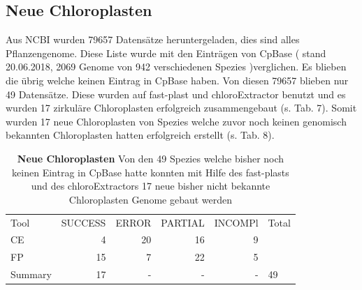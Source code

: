 \documentclass{scrartcl}
\begin{document}
\subsection{Neue Chloroplasten}
\label{sec-4-10}
Aus NCBI wurden 79657 Datensätze heruntergeladen, dies sind alles Pflanzengenome. Diese Liste wurde mit den Einträgen von CpBase ( stand 20.06.2018, 2069 Genome von 942 verschiedenen Spezies )verglichen. Es blieben die übrig welche keinen Eintrag in CpBase haben. 
Von diesen 79657 blieben nur 49 Datensätze. Diese wurden auf fast-plast und chloroExtractor benutzt und es wurden 17 zirkuläre Chloroplasten erfolgreich zusammengebaut (s. Tab. 7). Somit wurden 17 neue Chloroplasten von Spezies
welche zuvor noch keinen genomisch bekannten Chloroplasten hatten erfolgreich erstellt (s. Tab. 8).
\begin{table}[!h]
\caption[Neue Chloroplasten]{\textbf{Neue Chloroplasten} Von den 49 Spezies welche bisher noch keinen Eintrag in CpBase hatte konnten mit Hilfe des fast-plasts und des chloroExtractors 17 neue bisher nicht bekannte Chloroplasten Genome gebaut werden}
\begin{center}
\begin{tabular}{lrrrrl}
Tool & SUCCESS & ERROR & PARTIAL & INCOMPl & Total\\
CE & 4 & 20 & 16 & 9 & \\
FP & 15 & 7 & 22 & 5 & \\
Summary & 17 & - & - & - & 49\\
\end{tabular}
\end{center}
\end{table}
\end{document}
